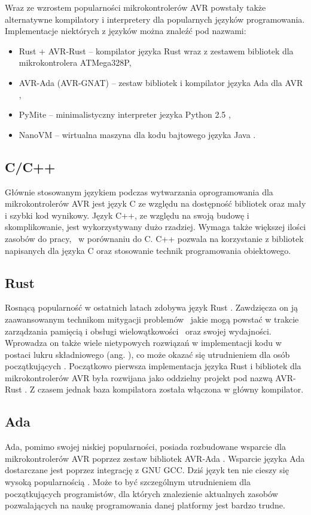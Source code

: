 Wraz ze wzrostem popularności mikrokontrolerów AVR powstały także alternatywne kompilatory i interpretery dla popularnych języków programowania. Implementacje niektórych z języków można znaleźć pod nazwami:
\begin{itemize}
\item Rust + AVR-Rust -- kompilator języka Rust wraz z zestawem bibliotek dla mikrokontrolera ATMega328P\cytowanie,
\item AVR-Ada (AVR-GNAT) -- zestaw bibliotek i kompilator języka Ada dla AVR \cytowanie,
\item PyMite -- minimalistyczny interpreter jezyka Python 2.5 \cytowanie,
\item NanoVM -- wirtualna maszyna dla kodu bajtowego języka Java \cytowanie.
\end{itemize}
\subsection{C/C++}
Głównie stosowanym językiem podczas wytwarzania oprogramowania dla mikrokontrolerów AVR jest język C ze względu na dostępność bibliotek oraz mały i szybki kod wynikowy. Język C++, ze względu na swoją budowę i skomplikowanie, jest wykorzystywany dużo rzadziej. Wymaga także większej ilości zasobów do pracy, \nocomma\ w porównaniu do C. C++ pozwala na korzystanie z bibliotek napisanych dla języka C oraz stosowanie technik programowania obiektowego.
\subsection{Rust}
Rosnącą popularność w ostatnich latach zdobywa język Rust . Zawdzięcza on ją zaawansowanym technikom mitygacji  problemów \comma\ jakie mogą powstać w trakcie zarządzania pamięcią i obsługi wielowątkowości \comma\ oraz swojej wydajności. Wprowadza on także wiele nietypowych rozwiązań w implementacji kodu w postaci lukru składniowego (ang. ), co może okazać się utrudnieniem dla osób początkujących . Początkowo pierwsza implementacja języka Rust i bibliotek dla mikrokontrolerów AVR była rozwijana jako oddzielny projekt pod nazwą AVR-Rust . Z czasem jednak baza kompilatora została włączona w główny kompilator.
\subsection{Ada}
Ada, pomimo swojej niskiej popularności, posiada rozbudowane wsparcie dla mikrokontrolerów AVR poprzez zestaw bibliotek AVR-Ada . Wsparcie języka Ada dostarczane jest poprzez integrację z GNU GCC. Dziś język ten nie cieszy się wysoką popularnością \cytowanie. Może to być szczególnym utrudnieniem dla początkujących programistów, dla których znalezienie aktualnych zasobów pozwalających na naukę programowania danej platformy jest bardzo trudne.
